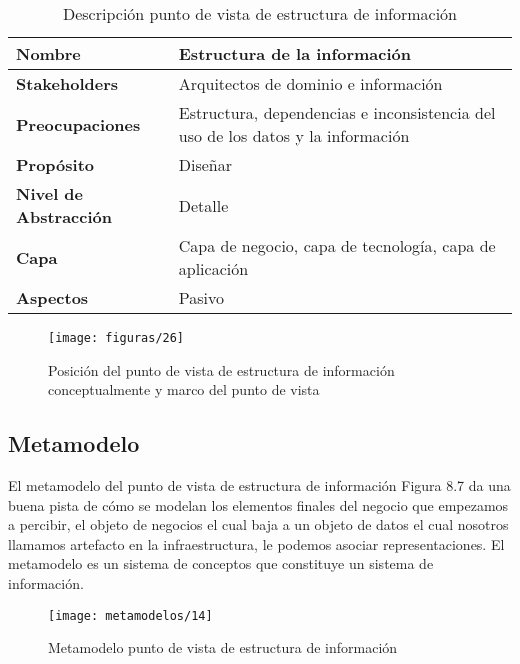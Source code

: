     \begin{table}[H]
    	\centering
    	\begin{tabular}{lp{8cm}}
    		\toprule
    		\textbf{Nombre} & \textbf{Estructura de la información} \\
    		\midrule
    		\textbf{Stakeholders} & Arquitectos de dominio e información \\
    		\textbf{Preocupaciones} & Estructura, dependencias e inconsistencia del uso de los datos y la información  \\
    		\textbf{Propósito} & Diseñar \\
    		\textbf{Nivel de Abstracción} & Detalle \\
    		\textbf{Capa} & Capa de negocio, capa de tecnología, capa de aplicación \\
    		\textbf{Aspectos} & Pasivo \\
    		\bottomrule
    	\end{tabular}
    	\captionsetup{width=.95\textwidth}
    	\caption{Descripción punto de vista de estructura de información}
    	\label{tabla17}
    \end{table}
    
    \begin{figure}[H]
    	\centering
    	\texttt{[image: figuras/26]}
    	\captionsetup{width=.95\textwidth}
    	\caption{Posición del punto de vista de estructura de información conceptualmente y marco del punto de vista}
    	\label{figura26}
    \end{figure}
    
    \subsection{Metamodelo}
    El metamodelo del punto de vista de estructura de información Figura 8.7 da una buena pista de cómo se modelan los elementos finales del negocio que empezamos a percibir, el objeto de negocios el cual baja a un objeto de datos el cual nosotros llamamos artefacto en la infraestructura, le podemos asociar representaciones. El metamodelo es un sistema de conceptos que constituye un sistema de información.
    
    \begin{figure}[H]
    	\centering
    	\texttt{[image: metamodelos/14]}
    	\captionsetup{width=.95\textwidth}
    	\caption{Metamodelo punto de vista de estructura de información}
    	\label{metamodelo14}
    \end{figure}
    

